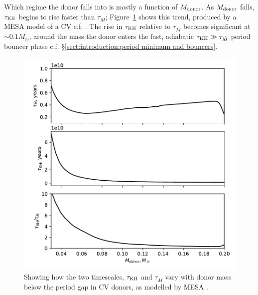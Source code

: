 Which regime the donor falls into is mostly a function of $M_{\rm donor}$. As $M_{\rm donor}$ falls, $\tau_{\rm KH}$ begins to rise faster than $\tau_{\dot M}$; Figure~\ref{fig:modelling:how does tauKH and tauMdot vary with donor mass} shows this trend, produced by a MESA model of a CV c.f. \citep{Paxton_2015,Pala2017a}.
The rise in $\tau_{\rm KH}$ relative to $\tau_{\dot M}$ becomes significant at $\sim 0.1 M_\odot$, around the mass the donor enters the fast, adiabatic $\tau_{\rm KH} \gg \tau_{\dot M}$ period bouncer phase c.f. \S\ref{sect:introduction:period minimum and bouncers}.
\begin{figure}
    \centering
    \includegraphics[width=\textwidth]{figures/modelling/tau_both_vs_donor_mass_AML000.pdf}
    \caption{Showing how the two timescales, $\tau_{\rm KH}$ and $\tau_{\dot M}$ vary with donor mass below the period gap in CV donors, as modelled by MESA \citep{Paxton_2015,Pala2017a}.}
    \label{fig:modelling:how does tauKH and tauMdot vary with donor mass}
\end{figure}

